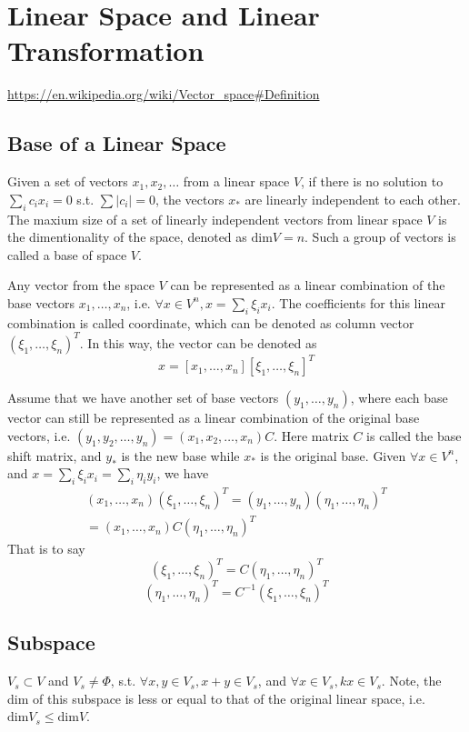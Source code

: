
\section{Linear Space and Linear Transformation}

\url{https://en.wikipedia.org/wiki/Vector_space#Definition}

\subsection{Base of a Linear Space}

Given a set of vectors ${x_1, x_2, \ldots}$ from a linear
space $V$, if there is no solution to $\sum_i c_i x_i = 0$ s.t. $\sum|c_i|=0$,
the vectors $x_*$ are linearly independent to each other. The maxium size of
a set of linearly independent vectors from linear space $V$ is the
dimentionality of the space, denoted as $\text{dim}V=n$. Such a group of
vectors is called a base of space $V$.

Any vector from the space $V$ can be represented as a linear combination
of the base vectors $x_1,\ldots,x_n$, i.e.
$\forall x\in V^n, x = \sum_i \xi_i x_i$. The coefficients for this linear
combination is called coordinate, which can be denoted as column vector
$(\xi_1,\ldots,\xi_n)^T$. In this way, the vector can be denoted as
$$x = [x_1, \ldots, x_n][\xi_1,\ldots,\xi_n]^T$$

Assume that we have another set of base vectors $(y_1,\ldots,y_n)$, where 
each base vector can still be represented as a linear combination of the
original base vectors, i.e. $(y_1,y_2,\ldots,y_n) = (x_1,x_2,\ldots,x_n)C$.
Here matrix $C$ is called the base shift matrix, and $y_*$ is the new base
while $x_*$ is the original base. Given $\forall x\in V^n$, and
$x = \sum_i \xi_i x_i = \sum_i \eta_i y_i$, we have
\begin{align}
(x_1,\ldots,x_n)(\xi_1,\ldots,\xi_n)^T = (y_1,\ldots,y_n)
	(\eta_1,\ldots,\eta_n)^T \\= (x_1,\ldots,x_n)C(\eta_1,\ldots,\eta_n)^T
\end{align}
That is to say
$$(\xi_1,\ldots,\xi_n)^T = C(\eta_1,\ldots,\eta_n)^T$$
$$(\eta_1,\ldots,\eta_n)^T = C^{-1}(\xi_1,\ldots,\xi_n)^T$$

\subsection{Subspace}

$V_s \subset V$ and $V_s \neq \Phi$, s.t.  $\forall x, y \in V_s, x+y\in V_s$,
and $\forall x\in V_s, kx \in V_s$. Note, the dim of this subspace is less or
equal to that of the original linear space, i.e.
$\text{dim} V_s \leq \text{dim} V$.

